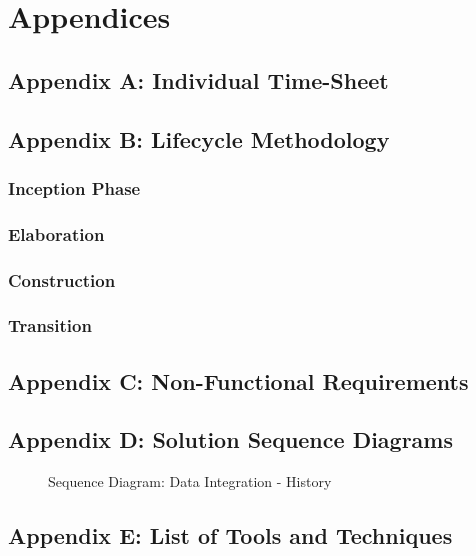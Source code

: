 \documentclass[12pt]{article} %
\begin{document}
	\section{Appendices}
	
	\subsection{Appendix A: Individual Time-Sheet}
		
	\subsection{Appendix B: Lifecycle Methodology}
	
	\subsubsection{Inception Phase}
	
	\subsubsection{Elaboration}
	
	\subsubsection{Construction}
	
	\subsubsection{Transition}
	
	\subsection{Appendix C: Non-Functional Requirements}
	
	\subsection{Appendix D: Solution Sequence Diagrams}
		
		\begin{figure}[H] %
			\caption{Sequence Diagram: Data Integration - History}
			\label{fig:speciation}
		\end{figure}
		
	\subsection{Appendix E: List of Tools and Techniques}
	
	
\end{document}
